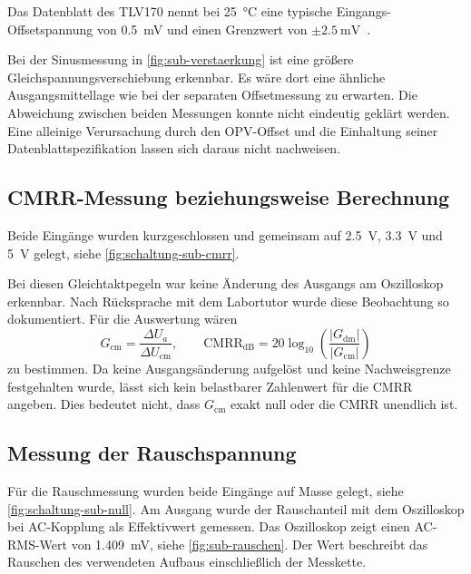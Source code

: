 \documentclass[11pt,a4paper]{scrartcl}
\begin{document}
Das Datenblatt des TLV170 nennt bei \SI{25}{\celsius} eine typische Eingangs-Offsetspannung von \SI{0.5}{\milli\volt} und einen Grenzwert von $\pm\SI{2.5}{\milli\volt}$~\cite{tlv170-datenblatt}.

Bei der Sinusmessung in \cref{fig:sub-verstaerkung} ist eine größere Gleichspannungsverschiebung erkennbar.
Es wäre dort eine ähnliche Ausgangsmittellage wie bei der separaten Offsetmessung zu erwarten.
Die Abweichung zwischen beiden Messungen konnte nicht eindeutig geklärt werden.
Eine alleinige Verursachung durch den OPV-Offset und die Einhaltung seiner Datenblattspezifikation lassen sich daraus nicht nachweisen.

\subsection{CMRR-Messung beziehungsweise Berechnung}
Beide Eingänge wurden kurzgeschlossen und gemeinsam auf \SI{2.5}{\volt}, \SI{3.3}{\volt} und \SI{5}{\volt} gelegt, siehe \cref{fig:schaltung-sub-cmrr}.


Bei diesen Gleichtaktpegeln war keine Änderung des Ausgangs am Oszilloskop erkennbar.
Nach Rücksprache mit dem Labortutor wurde diese Beobachtung so dokumentiert.
Für die Auswertung wären
\[
  G_{\mathrm{cm}}=\frac{\Delta U_a}{\Delta U_{\mathrm{cm}}},
  \qquad \mathrm{CMRR}_{\mathrm{dB}}
  =20\log_{10}\!\left(\frac{|G_{\mathrm{dm}}|}{|G_{\mathrm{cm}}|}\right)
\]
zu bestimmen.
Da keine Ausgangsänderung aufgelöst und keine Nachweisgrenze festgehalten wurde, lässt sich kein belastbarer Zahlenwert für die CMRR angeben.
Dies bedeutet nicht, dass $G_{\mathrm{cm}}$ exakt null oder die CMRR unendlich ist.


\subsection{Messung der Rauschspannung}
Für die Rauschmessung wurden beide Eingänge auf Masse gelegt, siehe \cref{fig:schaltung-sub-null}.
Am Ausgang wurde der Rauschanteil mit dem Oszilloskop bei AC-Kopplung als Effektivwert gemessen.
Das Oszilloskop zeigt einen AC-RMS-Wert von \SI{1.409}{\milli\volt}, siehe \cref{fig:sub-rauschen}.
Der Wert beschreibt das Rauschen des verwendeten Aufbaus einschließlich der Messkette.
\end{document}
